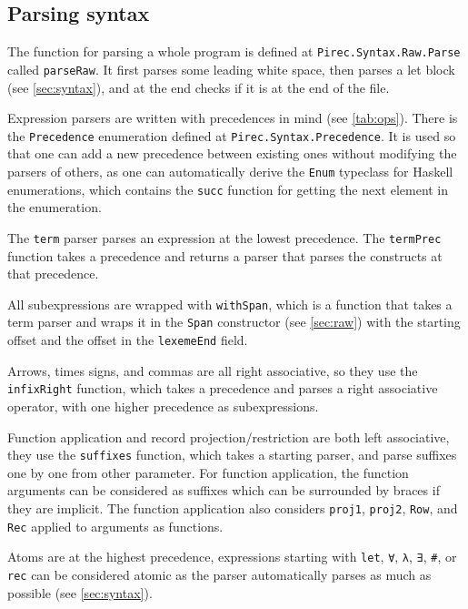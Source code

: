 \subsection{Parsing syntax}\label{ssec:parsing-syntax}

The function for parsing a whole program is defined at
\texttt{Pirec.Syntax.Raw.Parse} called \texttt{parseRaw}. It first
parses some leading white space, then parses a let block (see
\cref{sec:syntax}), and at the end checks if it is at the end of the file.

Expression parsers are written with precedences in mind (see \cref{tab:ops}).
There is the \texttt{Precedence} enumeration defined at
\texttt{Pirec.Syntax.Precedence}. It is used so that one can add a new
precedence between existing ones without modifying the parsers of others, as one
can automatically derive the \texttt{Enum} typeclass for Haskell
enumerations, which contains the \texttt{succ} function for getting the
next element in the enumeration.

The \texttt{term} parser parses an expression at the lowest precedence.
The \texttt{termPrec} function takes a precedence and returns a parser
that parses the constructs at that precedence.

All subexpressions are wrapped with \texttt{withSpan}, which is a
function that takes a term parser and wraps it in the \texttt{Span}
constructor (see \cref{sec:raw}) with the starting offset and the offset in the
\texttt{lexemeEnd} field.

Arrows, times signs, and commas are all right associative, so they use the
\texttt{infixRight} function, which takes a precedence and parses a
right associative operator, with one higher precedence as subexpressions.

Function application and record projection\slash{}restriction are both left
associative, they use the \texttt{suffixes} function, which takes a
starting parser, and parse suffixes one by one from other parameter. For
function application, the function arguments can be considered as suffixes which
can be surrounded by braces if they are implicit. The function application also
considers \texttt{proj1},
\texttt{proj2}, \texttt{Row}, and \texttt{Rec} applied to arguments as
functions.

Atoms are at the highest precedence, expressions starting with
\texttt{let}, \texttt{∀}, \texttt{λ}, \texttt{∃}, \texttt{#}, or
\texttt{rec} can be considered atomic as the parser
automatically parses as much as possible (see \cref{sec:syntax}).

